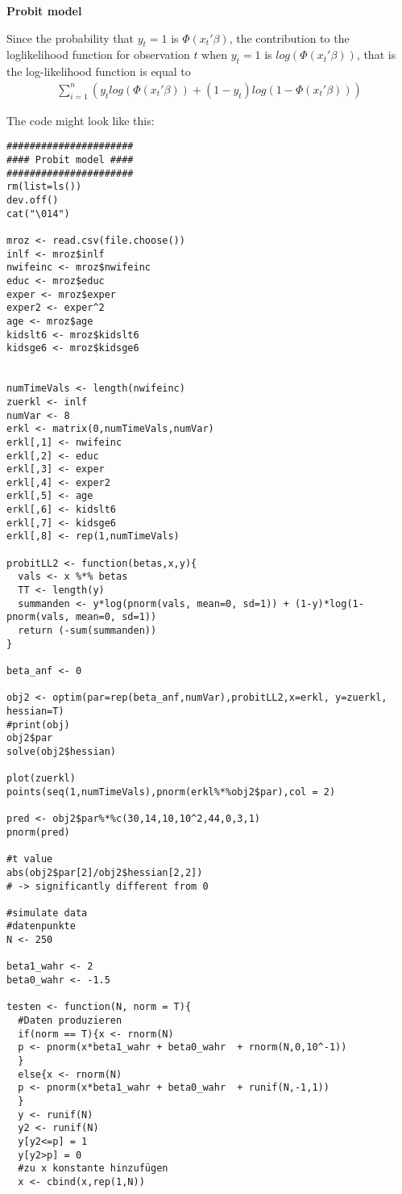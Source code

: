 \documentclass{article}
\begin{document}
\begin{solution}
\textbf{Probit model}

Since the probability that $y_t=1$ is $\Phi(x_t'\beta)$, the contribution to the loglikelihood function for observation $t$ when $y_t=1$ is $log(\Phi(x_t'\beta))$, that is the log-likelihood function is equal to
\begin{align*}
\sum_{i=1}^{n} \left(y_t log(\Phi(x_t'\beta)) + (1-y_t)log(1-\Phi(x_t'\beta))\right)
\end{align*}

The code might look like this:
\begin{verbatim}
######################
#### Probit model ####
######################
rm(list=ls())
dev.off()
cat("\014")

mroz <- read.csv(file.choose())
inlf <- mroz$inlf
nwifeinc <- mroz$nwifeinc
educ <- mroz$educ
exper <- mroz$exper
exper2 <- exper^2
age <- mroz$age
kidslt6 <- mroz$kidslt6
kidsge6 <- mroz$kidsge6


numTimeVals <- length(nwifeinc)
zuerkl <- inlf
numVar <- 8
erkl <- matrix(0,numTimeVals,numVar)
erkl[,1] <- nwifeinc
erkl[,2] <- educ
erkl[,3] <- exper
erkl[,4] <- exper2
erkl[,5] <- age
erkl[,6] <- kidslt6
erkl[,7] <- kidsge6
erkl[,8] <- rep(1,numTimeVals)

probitLL2 <- function(betas,x,y){
  vals <- x %*% betas
  TT <- length(y)
  summanden <- y*log(pnorm(vals, mean=0, sd=1)) + (1-y)*log(1-pnorm(vals, mean=0, sd=1))
  return (-sum(summanden))
}

beta_anf <- 0

obj2 <- optim(par=rep(beta_anf,numVar),probitLL2,x=erkl, y=zuerkl, hessian=T)
#print(obj)
obj2$par
solve(obj2$hessian)

plot(zuerkl)
points(seq(1,numTimeVals),pnorm(erkl%*%obj2$par),col = 2)

pred <- obj2$par%*%c(30,14,10,10^2,44,0,3,1)
pnorm(pred)

#t value
abs(obj2$par[2]/obj2$hessian[2,2])
# -> significantly different from 0

#simulate data
#datenpunkte
N <- 250

beta1_wahr <- 2
beta0_wahr <- -1.5

testen <- function(N, norm = T){
  #Daten produzieren
  if(norm == T){x <- rnorm(N)
  p <- pnorm(x*beta1_wahr + beta0_wahr  + rnorm(N,0,10^-1))
  }
  else{x <- rnorm(N)
  p <- pnorm(x*beta1_wahr + beta0_wahr  + runif(N,-1,1))
  }
  y <- runif(N)
  y2 <- runif(N)
  y[y2<=p] = 1
  y[y2>p] = 0
  #zu x konstante hinzufügen
  x <- cbind(x,rep(1,N))


\end{verbatim}
\end{solution}
\end{document}
